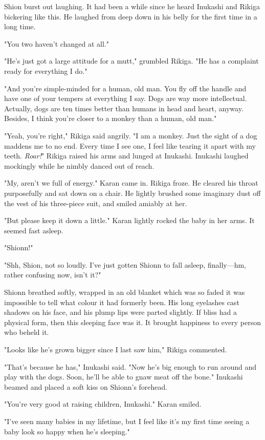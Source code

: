 Shion burst out laughing. It had been a while since he heard Inukashi
and Rikiga bickering like this. He laughed from deep down in his belly
for the first time in a long time.

"You two haven't changed at all."

"He's just got a large attitude for a mutt," grumbled Rikiga. "He has a
complaint ready for everything I do."

"And you're simple-minded for a human, old man. You fly off the handle
and have one of your tempers at everything I say. Dogs are way more
intellectual. Actually, dogs are ten times better than humans in head
and heart, anyway. Besides, I think you're closer to a monkey than a
human, old man."

"Yeah, you're right," Rikiga said angrily. "I am a monkey. Just the
sight of a dog maddens me to no end. Every time I see one, I feel like
tearing it apart with my teeth. \emph{Roar!}" Rikiga raised his arms and lunged
at Inukashi. Inukashi laughed mockingly while he nimbly danced out of
reach.

"My, aren't we full of energy." Karan came in. Rikiga froze. He cleared
his throat purposefully and sat down on a chair. He lightly brushed some
imaginary dust off the vest of his three-piece suit, and smiled amiably
at her.

"But please keep it down a little." Karan lightly rocked the baby in her
arms. It seemed fast asleep.

"Shionn!"

"Shh, Shion, not so loudly. I've just gotten Shionn to fall asleep,
finally---hm, rather confusing now, isn't it?"

Shionn breathed softly, wrapped in an old blanket which was so faded it
was impossible to tell what colour it had formerly been. His long
eyelashes cast shadows on his face, and his plump lips were parted
slightly. If bliss had a physical form, then this sleeping face was it.
It brought happiness to every person who beheld it.

"Looks like he's grown bigger since I last saw him," Rikiga commented.

"That's because he has," Inukashi said. "Now he's big enough to run
around and play with the dogs. Soon, he'll be able to gnaw meat off the
bone." Inukashi beamed and placed a soft kiss on Shionn's forehead.

"You're very good at raising children, Inukashi." Karan smiled.~

"I've seen many babies in my lifetime, but I feel like it's my first
time seeing a baby look so happy when he's sleeping."

